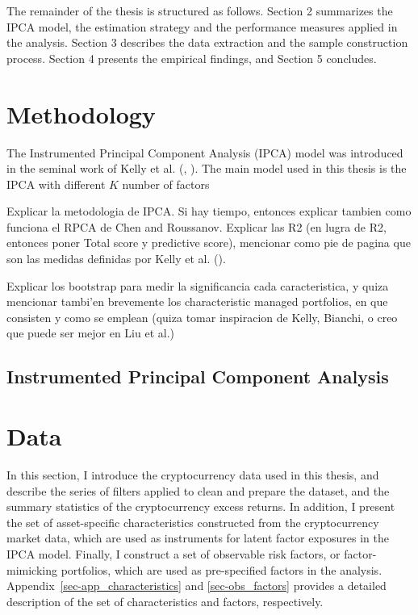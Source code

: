 \documentclass[
  12pt,
  a4paper,
  openany]{scrbook}
\begin{document}
The remainder of the thesis is structured as follows. Section 2
summarizes the IPCA model, the estimation strategy and the performance
measures applied in the analysis. Section 3 describes the data
extraction and the sample construction process. Section 4 presents the
empirical findings, and Section 5 concludes.


\chapter{Methodology}\label{sec-methodology}

The Instrumented Principal Component Analysis (IPCA) model was
introduced in the seminal work of Kelly et al.
(,
). The main model
used in this thesis is the IPCA with different \(K\) number of factors

Explicar la metodologia de IPCA. Si hay tiempo, entonces explicar
tambien como funciona el RPCA de Chen and Roussanov. Explicar las R2 (en
lugra de R2, entonces poner Total score y predictive score), mencionar
como pie de pagina que son las medidas definidas por Kelly et al.
().

Explicar los bootstrap para medir la significancia cada caracteristica,
y quiza mencionar tambi'en brevemente los characteristic managed
portfolios, en que consisten y como se emplean (quiza tomar inspiracion
de Kelly, Bianchi, o creo que puede ser mejor en Liu et al.)

\section{Instrumented Principal Component
Analysis}\label{instrumented-principal-component-analysis}


\chapter{Data}\label{sec-data}

In this section, I introduce the cryptocurrency data used in this
thesis, and describe the series of filters applied to clean and prepare
the dataset, and the summary statistics of the cryptocurrency excess
returns. In addition, I present the set of asset-specific
characteristics constructed from the cryptocurrency market data, which
are used as instruments for latent factor exposures in the IPCA model.
Finally, I construct a set of observable risk factors, or
factor-mimicking portfolios, which are used as pre-specified factors in
the analysis. Appendix~\ref{sec-app_characteristics} and
\ref{sec-obs_factors} provides a detailed description of the set of
characteristics and factors, respectively.
\end{document}
